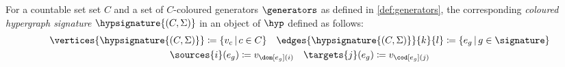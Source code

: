 \begin{definition}\label{def:coloured-hypergraph-signature}
    For a countable set set \(C\) and a set of \(C\)-coloured generators
    \(\generators\) as defined in \cref{def:generators}, the corresponding
    \emph{coloured hypergraph signature}
    \(\hypsignature{(C,\Sigma)}\) in an object of \(\hyp\) defined as
    follows:
    \begin{gather*}
        \vertices{\hypsignature{(C,\Sigma)}} \coloneqq \{ v_c \,|\, c \in C\}
        \quad
        \edges{\hypsignature{(C,\Sigma)}}{k}{l} \coloneqq \{ e_g \,|\, g \in \signature\}
        \\
        \sources{i}(e_g) \coloneqq v_{\dom[e_g](i)}
        \quad
        \targets{j}(e_g) \coloneqq v_{\cod[e_g](j)}
    \end{gather*}
\end{definition}

